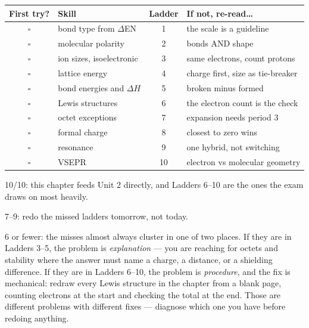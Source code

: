 \documentclass{apchem-worksheet}
\begin{document}
\renewcommand{\arraystretch}{1.35}
\noindent\begin{tabular}{@{}c p{6.2cm} c p{4.8cm}@{}}
\toprule
\textbf{First try?} & \textbf{Skill} & \textbf{Ladder} &
  \textbf{If not, re-read\ldots}\\
\midrule
$\square$ & bond type from $\Delta$EN & 1 & the scale is a guideline \\
$\square$ & molecular polarity & 2 & bonds AND shape \\
$\square$ & ion sizes, isoelectronic & 3 & same electrons, count protons \\
$\square$ & lattice energy & 4 & charge first, size as tie-breaker \\
$\square$ & bond energies and $\Delta H$ & 5 & broken minus formed \\
$\square$ & Lewis structures & 6 & the electron count is the check \\
$\square$ & octet exceptions & 7 & expansion needs period 3 \\
$\square$ & formal charge & 8 & closest to zero wins \\
$\square$ & resonance & 9 & one hybrid, not switching \\
$\square$ & VSEPR & 10 & electron vs molecular geometry \\
\bottomrule
\end{tabular}

\begin{apcnote}
10/10: this chapter feeds Unit 2 directly, and Ladders 6--10 are the ones
the exam draws on most heavily.

7--9: redo the missed ladders tomorrow, not today.

6 or fewer: the misses almost always cluster in one of two places.
If they are in Ladders 3--5, the problem is \emph{explanation} --- you
are reaching for octets and stability where the answer must name a
charge, a distance, or a shielding difference. If they are in Ladders
6--10, the problem is \emph{procedure}, and the fix is mechanical:
redraw every Lewis structure in the chapter from a blank page, counting
electrons at the start and checking the total at the end. Those are
different problems with different fixes --- diagnose which one you have
before redoing anything.
\end{apcnote}
\end{document}
